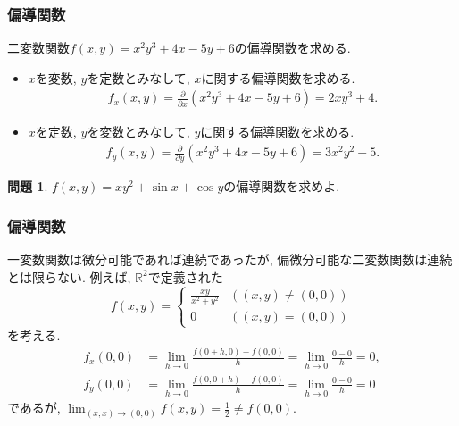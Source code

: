 \documentclass[dvipdfmx,cjk,10.2pt]{beamer}
\newcommand{\R}{\mathbb{R}}
\theoremstyle{definition}
\newtheorem{Prob}[Thm]{問題}
\begin{document}


\begin{frame}
\frametitle{偏導関数}


二変数関数$f(x,y)=x^2y^3+4x-5y+6$の偏導関数を求める. 

\begin{itemize}
\item $x$を変数, $y$を定数とみなして, $x$に関する偏導関数を求める. 
\begin{align*}
f_x(x,y)=\frac{\partial}{\partial x}(x^2y^3+4x-5y+6) = 2xy^3+4. 
\end{align*}
\item $x$を定数, $y$を変数とみなして, $y$に関する偏導関数を求める. 
\begin{align*}
f_y(x,y)=\frac{\partial}{\partial y}(x^2y^3+4x-5y+6) = 3x^2y^2-5. 
\end{align*}
\end{itemize}

\begin{Prob}
$f(x,y)=xy^2+\sin x + \cos y$の偏導関数を求めよ. 
\end{Prob}

\end{frame}





\begin{frame}
\frametitle{偏導関数}

一変数関数は微分可能であれば連続であったが, 偏微分可能な二変数関数は連続とは限らない. 
例えば, $\R^2$で定義された
$$
f(x,y)=
\begin{cases}
\frac{xy}{x^2+y^2}  & ((x,y) \ne (0,0)) \\
0 & ((x,y)=(0,0)) 
 \end{cases}
$$
を考える. 
\begin{align*}
f_x(0,0) &=\lim_{h\to 0}\frac{f(0+h,0)-f(0,0)}{h}=\lim_{h\to 0}\frac{0-0}{h}=0, \\
f_y(0,0) &=\lim_{h\to 0}\frac{f(0,0+h)-f(0,0)}{h}=\lim_{h\to 0}\frac{0-0}{h}=0
\end{align*}
であるが, $\displaystyle \lim_{(x,x)\to (0,0)} f(x,y)= \frac{1}{2} \ne f(0,0)$. 

\end{frame}
\end{document}
